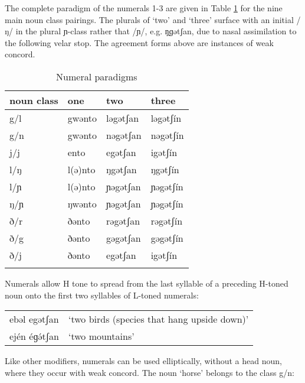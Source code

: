 The complete paradigm of the numerals 1-3 are given in Table \ref{tab:ch8:3} for the nine main noun class pairings. The plurals of ‘two’ and ‘three’ surface with an initial /ŋ/ in the plural ɲ-class rather that /ɲ/, e.g. ŋ̘ɡətʃan, due to nasal assimilation to the following velar stop. The agreement forms above are instances of weak concord.


\begin{table}
 \begin{tabular}[t]{llll}
\lsptoprule
noun class & one & two & three\\
\midrule
g/l & gwənto & ləgətʃan & ləgətʃín\\
g/n	& gwənto & nəgətʃan & nəgətʃín\\
j/j & ento & egətʃan & igətʃín	\\
l/ŋ & l(ə)nto & ŋgətʃan & ŋgətʃín	\\
l/ɲ & l(ə)nto & ɲəgətʃan & ɲəgətʃín	\\
ŋ/ɲ & ŋwənto & ɲəgətʃan & ɲəgətʃín	\\
ð/r & ðənto & rəgətʃan & rəgətʃín	\\
ð/g & ðənto & gəgətʃan & gəgətʃín	\\
ð/j & ðənto & egətʃan & igətʃín	\\	
\lspbottomrule
 \end{tabular}
  \caption{Numeral paradigms}
  \label{tab:ch8:3}
\end{table}


Numerals allow H tone to spread from the last syllable of a preceding H-toned noun onto the first two syllables of L-toned numerals:

\ea \begin{tabular}[t]{ll}
	 ebəl egətʃan &	‘two birds (species that hang upside down)’ \\
	 ején éɡə́tʃan &	‘two mountains’ 	 \\
 \end{tabular}
 \z 


Like other modifiers, numerals can be used elliptically, without a head noun, where they occur with weak concord. The noun ‘horse’ belongs to the class g/n:

